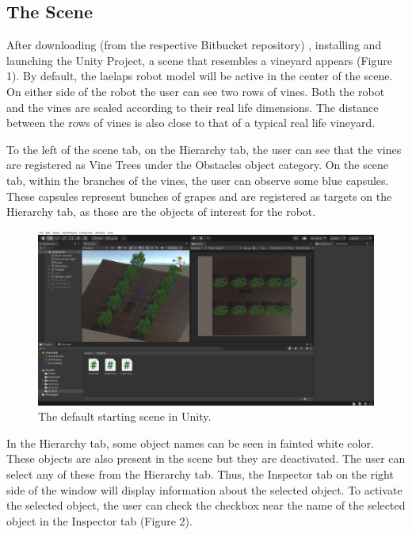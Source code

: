 \documentclass{article}
\begin{document}
\subsection{The Scene}

After downloading (from the respective Bitbucket repository) \cite{noauthor_csl_legged_nodate}, installing and launching the Unity Project, a scene that resembles a vineyard appears (Figure 1). By default, the laelaps robot model will be active in the center of the scene. On either side of the robot the user can see two rows of vines. Both the robot and the vines are scaled according to their real life dimensions. The distance between the rows of vines is also close to that of a typical real life vineyard. 

To the left of the scene tab, on the Hierarchy tab, the user can see that the vines are registered as Vine Trees under the Obstacles object category. On the scene tab, within the branches of the vines, the user can observe some blue capsules. These capsules represent bunches of grapes and are registered as targets on the Hierarchy tab, as those are the objects of interest for the robot. 

\begin{figure}
	\includegraphics[width=1.7\textwidth, center]{FOV.png} %
	\caption{The default starting scene in Unity.}
\end{figure}
\clearpage

In the Hierarchy tab, some object names can be seen in fainted white color. These objects are also present in the scene but they are deactivated. The user can select any of these from the Hierarchy tab. Thus, the Inspector tab on the right side of the window will display information about the selected object. To activate the selected object, the user can check the checkbox near the name of the selected object in the Inspector tab (Figure 2).
\end{document}
